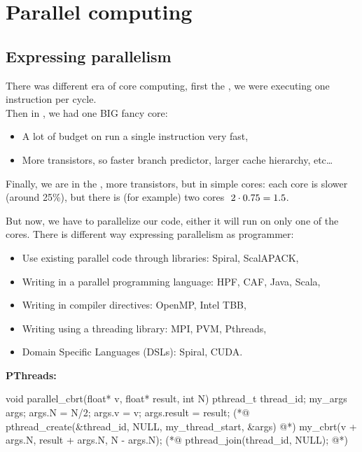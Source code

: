 \section{Parallel computing}
\subsection{Expressing parallelism}
\begin{tcolorbox}[violet] 
    There was different era of core computing, first the , we were executing one instruction per cycle.\\
    Then in , we had one BIG fancy core:
    \begin{itemize}[left=10pt, label=\textbullet]
        \item A lot of budget on run a single instruction very fast, 
        \item More transistors, so faster branch predictor, larger cache hierarchy, etc\ldots
    \end{itemize}
    Finally, we are in the , more transistors, but in simple cores: each core is slower (around 25\%), but there is (for example) two cores \textrightarrow $\mathspace 2\cdot 0.75 = 1.5$.\\   
\end{tcolorbox}

    But now, we have to parallelize our code, either it will run on only one of the cores. There is different way expressing parallelism as programmer:
    \begin{itemize}[left=10pt, label=\textbullet]
        \item Use existing parallel code through libraries: Spiral, ScalAPACK,
        \item Writing in a parallel programming language: HPF, CAF, Java, Scala, 
        \item Writing in compiler directives: OpenMP, Intel TBB, 
        \item Writing using a threading library: MPI, PVM, Pthreads, 
        \item Domain Specific Languages (DSLs): Spiral, CUDA.
    \end{itemize}
    \newpage
    \textbf{PThreads:}
    \begin{codeCenter}
    \begin{Ccode}
void parallel_cbrt(float* v, float* result, int N) {
    pthread_t thread_id;
    my_args args;
    args.N = N/2;
    args.v = v;
    args.result = result;
   (*@ \colorbox{red!30}{pthread\_create(\&thread\_id, NULL, my\_thread\_start, \&args)} @*)
    my_cbrt(v + args.N, result + args.N, N - args.N);
   (*@ \colorbox{red!30}{pthread\_join(thread\_id, NULL);} @*)
}
    \end{Ccode}
    \end{codeCenter}
    

